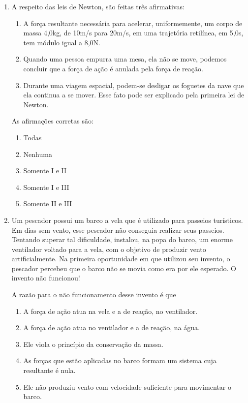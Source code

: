 \documentclass[12pt,letterpaper,fleqn]{article}
\begin{document}
\begin{enumerate}
\item A respeito das leis de Newton, são feitas três afirmativas:
\begin{enumerate}[I]
    \item A força resultante necessária para acelerar, uniformemente, um corpo de massa 4,0kg, de 10m/s para 20m/s, em uma trajetória retilínea, em 5,0s, tem módulo igual a 8,0N.
    \item Quando uma pessoa empurra uma mesa, ela não se move, podemos concluir que a força de ação é anulada pela força de reação. 
    \item Durante uma viagem espacial, podem-se desligar os foguetes da nave que ela continua a se mover. Esse fato pode ser explicado pela primeira lei de Newton.
\end{enumerate}
As afirmações corretas são:

\begin{enumerate}
    \item Todas
    \item Nenhuma
    \item Somente I e II
    \item Somente I e III
    \item Somente II e III
\end{enumerate}

\item Um pescador possui um barco a vela que é utilizado para passeios turísticos. Em dias sem vento, esse pescador não conseguia realizar seus passeios.  Tentando superar tal dificuldade, instalou, na popa do barco, um enorme ventilador voltado para a vela, com o objetivo de produzir vento artificialmente. Na primeira oportunidade em que utilizou seu invento, o pescador percebeu que o barco não se movia como era por ele esperado. O invento não funcionou!

A razão para o não funcionamento desse invento é que
\begin{enumerate}
    \item A força de ação atua na vela e a de reação, no ventilador.
    \item A força de ação atua no ventilador e a de reação, na água.
    \item Ele viola o princípio da conservação da massa. 
    \item As forças que estão aplicadas no barco formam um sistema cuja resultante é nula.
    \item Ele não produziu vento com velocidade suficiente para movimentar o barco.
\end{enumerate}


\end{enumerate}
\end{document}
